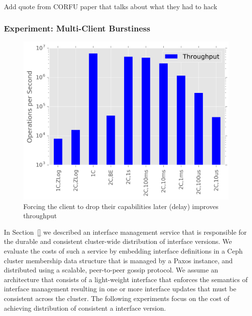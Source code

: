 \documentclass[10pt,twocolumn]{article}
\begin{document}
Add quote from CORFU paper that talks about what they had to hack

\subsubsection{Experiment: Multi-Client
Burstiness}\label{experiment-multi-client-burstiness}

\begin{figure}[htbp]
\centering
\includegraphics{figures/caps-delay-thruput.png}
\caption{Forcing the client to drop their capabilities later (delay)
improves throughput}
\end{figure}

In Section~\ref{} we described an interface management service that is
responsible for the durable and consistent cluster-wide distribution of
interface versions. We evaluate the costs of such a service by embedding
interface definitions in a Ceph cluster membership data structure that is
managed by a Paxos instance, and distributed using a scalable, peer-to-peer
gossip protocol. We assume an architecture that consists of a light-weight
interface that enforces the semantics of interface management resulting in one
or more interface updates that must be consistent across the cluster. The
following experiments focus on the cost of achieving distribution of consistent
a interface version.
\end{document}
